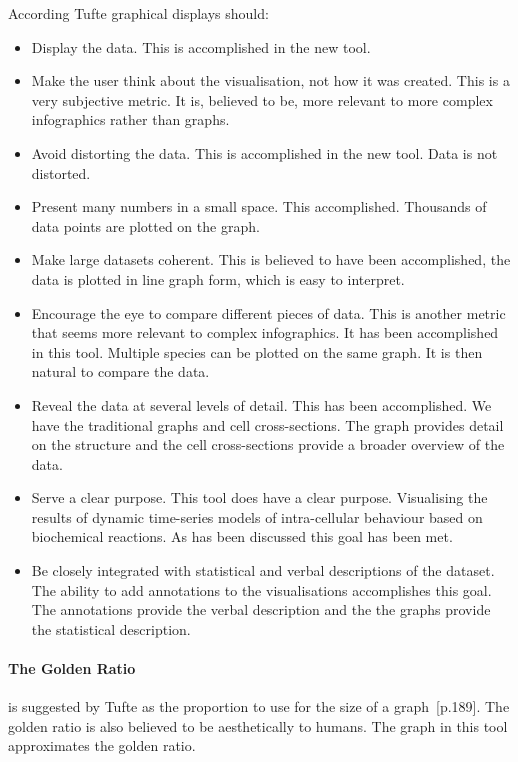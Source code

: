 According Tufte graphical displays should:
\begin{itemize}
\item Display the data.  This is accomplished in the new tool.
\item Make the user think about the visualisation, not how it was created.  This is a very subjective metric.  It is, believed to be, more relevant to more complex infographics rather than graphs.
\item Avoid distorting the data.  This is accomplished in the new tool.  Data is not distorted.
\item Present many numbers in a small space.  This accomplished.  Thousands of data points are plotted on the graph.
\item Make large datasets coherent.  This is believed to have been accomplished, the data is plotted in line graph form, which is easy to interpret.
\item Encourage the eye to compare different pieces of data.  This is another metric that seems more relevant to complex infographics.  It has been accomplished in this tool.  Multiple species can be plotted on the same graph.  It is then natural to compare the data.
\item Reveal the data at several levels of detail.  This has been accomplished.
We have the traditional graphs and cell cross-sections.  The graph provides detail on the structure and the cell cross-sections provide a broader overview of the data.
\item Serve a clear purpose.  This tool does have a clear purpose.  Visualising the results of dynamic time-series models of intra-cellular behaviour based on biochemical reactions.  As has been discussed this goal has been met.
\item Be closely integrated with statistical and verbal descriptions of the dataset.  The ability to add annotations to the visualisations accomplishes this goal.  The annotations provide the verbal description and the the graphs provide the statistical description.
\end{itemize}

\paragraph{The Golden Ratio} is suggested by Tufte as the proportion to use for the size of a graph~\cite{tufte}[p.189].  The golden ratio is also believed to be aesthetically to humans.  The graph in this tool approximates the golden ratio.

